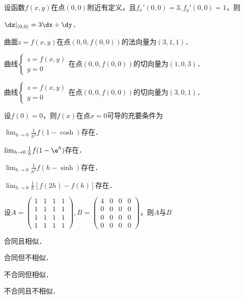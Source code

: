 \documentclass[plain,noanswer,medmath]{../../template/jnuexam}
\begin{document}
\begin{problem}
设函数$f(x,y)$在点$(0,0)$附近有定义，且$f_x'(0,0) = 3,f_y'(0,0) = 1$，则\pickout{}
\begin{abcd}
\item $\dz |_{(0,0)} = 3\dx + \dy$．
\item 曲面$z = f(x,y)$在点$(0,0,f(0,0))$的法向量为$(3,1,1)$．
\item 曲线$\begin{cases}
  z = f(x,y) \\
  y = 0
\end{cases}$在点$(0,0,f(0,0))$的切向量为$(1,0,3)$．
\item 曲线$\begin{cases}
  z = f(x,y) \\
  y = 0
\end{cases}$在点$(0,0,f(0,0))$的切向量为$(3,0,1)$．
\end{abcd}
\end{problem}


\begin{problem}
设$f(0) = 0$，则$f(x)$在点$x = 0$可导的充要条件为\pickout{}
\begin{abcd}
\item $\lim_{h \to 0} \frac{1}{h^2}f(1 - \cosh)$存在．
\item $\lim_{h \to 0} \frac{1}{h}f(1 - \e^h)$存在．
\item $\lim_{h \to 0} \frac{1}{h^2}f(h - \sinh)$存在．
\item $\lim_{h \to 0} \frac{1}{h}\left[f(2h) - f(h) \right]$存在．
\end{abcd}
\end{problem}


\begin{problem}
设$A = \begin{pmatrix}
  1 & 1 & 1 & 1 \\
  1 & 1 & 1 & 1 \\
  1 & 1 & 1 & 1 \\
  1 & 1 & 1 & 1
\end{pmatrix},B = \begin{pmatrix}
  4 & 0 & 0 & 0 \\
  0 & 0 & 0 & 0 \\
  0 & 0 & 0 & 0 \\
  0 & 0 & 0 & 0
\end{pmatrix}$，则$A$与$B$\pickout{}
\begin{abcd}
\item 合同且相似．
\item 合同但不相似．
\item 不合同但相似．
\item 不合同且不相似．
\end{abcd}
\end{problem}
\end{document}
